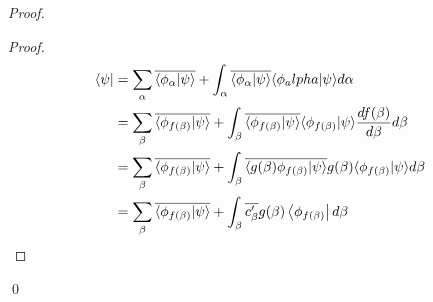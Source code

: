 \begin{proof}
\pf
{}
\begin{proof}
	\pf
	\begin{align*}
		\left\langle {\psi} \right| & = \sum_\alpha \overline{\langle \phi_\alpha | \psi \rangle} + \int_\alpha \overline{\langle \phi_\alpha | \psi \rangle} \langle \phi_alpha | \psi \rangle d \alpha \\
		& = \sum_\beta \overline{\langle \phi_{f(\beta)} | \psi \rangle} + \int_\beta \overline{\langle \phi_{f(\beta)} | \psi \rangle} \langle \phi_{f(\beta)} | \psi \rangle \frac{d f(\beta)}{d \beta} d \beta \\
		& = \sum_\beta \overline{\langle \phi_{f(\beta)} | \psi \rangle} + \int_\beta \overline{\langle g(\beta) \phi_{f(\beta)} | \psi \rangle} g(\beta) \langle \phi_{f(\beta)} | \psi \rangle d \beta \\
		& = \sum_\beta \overline{\langle \phi_{f(\beta)} | \psi \rangle} + \int_\beta \overline{c'_\beta} g(\beta) \left\langle {\phi_{f(\beta)}} \right| d \beta
	\end{align*}
\end{proof}
\qed
\end{proof}
